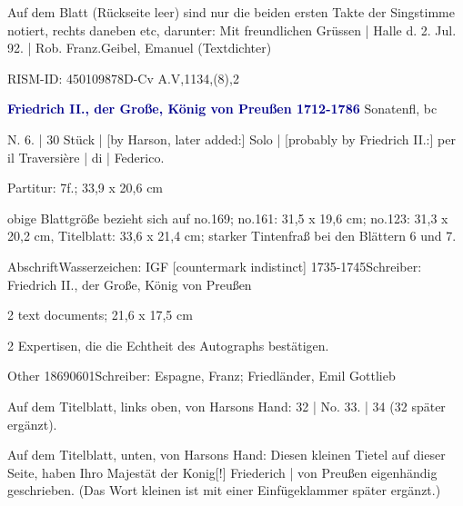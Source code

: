 \documentclass[a4paper, twocolumn, 11pt]{book}
\begin{document}
\newline %
\par Auf dem Blatt (Rückseite leer) sind nur die beiden ersten Takte der Singstimme notiert, rechts daneben {\textquotedbl}etc{\textquotedbl}, darunter: {\textquotedbl}Mit freundlichen Grüssen | Halle d. 2. Jul. 92. | Rob. Franz.{\textquotedbl}\newline Geibel, Emanuel  (Textdichter)
\par RISM-ID: 450109878\newline D-Cv  A.V,1134,(8),2
\par \vspace{16pt} \textcolor{darkblue}{\textbf{Friedrich II., der Große, König von Preußen  1712-1786}}\hfillplus{[32]} Sonaten\newline fl, bc
\par \begin{itshape} N. 6. | 30 Stück | [by Harson, later added:] Solo | [probably by Friedrich II.:] per il Traversière | di | Federico.\end{itshape} 
\par \textcolor{darkblue}{}  Partitur: 7f.; 33,9 x 20,6 cm\newline \begin{small} obige Blattgröße bezieht sich auf no.169; no.161: 31,5 x 19,6 cm; no.123: 31,3 x 20,2 cm, Titelblatt: 33,6 x 21,4 cm; starker Tintenfraß bei den Blättern 6 und 7.\end{small} \newline Abschrift\newline Wasserzeichen: IGF [countermark indistinct]  1735-1745\newline Schreiber: Friedrich II., der Große, König von Preußen
\par \textcolor{darkblue}{}  2 text documents; 21,6 x 17,5 cm\newline \begin{small} 2 Expertisen, die die Echtheit des Autographs bestätigen.\end{small} \newline Other  18690601\newline Schreiber: Espagne, Franz; Friedländer, Emil Gottlieb
\par Auf dem Titelblatt, links oben, von Harsons Hand: {\textquotedbl}32 | No. 33. | 34{\textquotedbl} (32 später ergänzt).
\par Auf dem Titelblatt, unten, von Harsons Hand: {\textquotedbl}Diesen kleinen Tietel auf dieser Seite, haben Ihro Majestät der Konig[!] Friederich | von Preußen eigenhändig geschrieben.{\textquotedbl} (Das Wort {\textquotedbl}kleinen{\textquotedbl} ist mit einer Einfügeklammer später ergänzt.)
\end{document}
